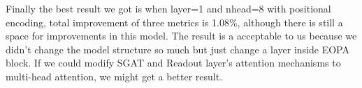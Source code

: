\documentclass{article}
\begin{document}
Finally the best result we got is when layer=1 and nhead=8
with positional encoding, total improvement of three metrics is  1.08\%,
although there is still a space for improvements in this model.
The result is a acceptable to us because we didn't change the model structure
so much but just change a layer inside EOPA block.
If we could modify SGAT and Readout layer's attention mechanisms
to multi-head attention, we might get a better result.





\end{document}
